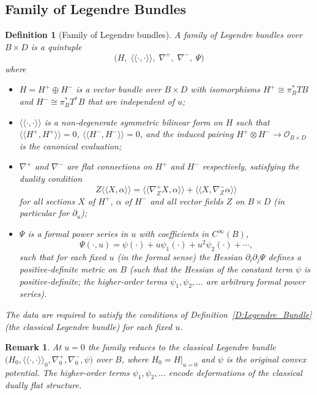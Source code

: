\documentclass[12pt]{amsart}
\newtheorem{dfn}{Definition}
\newtheorem{remark}{Remark}
\begin{document}
\subsection{Family of Legendre Bundles}\label{S:F-Legendrebundle}
\begin{dfn}[Family of Legendre bundles]\label{D:FLB}
A \emph{family of Legendre bundles} over $B\times D$ is a quintuple
\[
\bigl( H,\; \langle\!\langle\cdot,\cdot\rangle\!\rangle,\; \nabla^+,\; \nabla^-,\; \Psi \bigr)
\]
where
\begin{itemize}
\item $H = H^+ \oplus H^-$ is a vector bundle over $B\times D$ with isomorphisms 
  $H^+ \cong \pi_B^*TB$ and $H^- \cong \pi_B^*T^*B$ that are independent of $u$;
\item $\langle\!\langle\cdot,\cdot\rangle\!\rangle$ is a non‑degenerate symmetric bilinear form on $H$ such that 
  $\langle\!\langle H^+,H^+\rangle\!\rangle = 0$, $\langle\!\langle H^-,H^-\rangle\!\rangle = 0$,
  and the induced pairing $H^+\otimes H^-\to \mathcal{O}_{B\times D}$ is the canonical evaluation;
\item $\nabla^+$ and $\nabla^-$ are flat connections on $H^+$ and $H^-$ respectively, 
  satisfying the duality condition
  \[
  Z\langle\!\langle X,\alpha\rangle\!\rangle = \langle\!\langle \nabla^+_Z X,\alpha\rangle\!\rangle + \langle\!\langle X,\nabla^-_Z\alpha\rangle\!\rangle
  \]
  for all sections $X$ of $H^+$, $\alpha$ of $H^-$ and all vector fields $Z$ on $B\times D$ (in particular for $\partial_u$);
\item $\Psi$ is a formal power series in $u$ with coefficients in $C^\infty(B)$,
  \[
  \Psi(\cdot,u) = \psi(\cdot) + u\psi_1(\cdot) + u^2\psi_2(\cdot) + \cdots,
  \]
  such that for each fixed $u$ (in the formal sense) the Hessian $\partial_i\partial_j\Psi$ defines a positive‑definite metric on $B$ (such that the Hessian of the constant term $\psi$ is positive‑definite; the higher‑order terms $\psi_1,\psi_2,\dots$ are arbitrary formal power series).
\end{itemize}
The data are required to satisfy the conditions of Definition~\ref{D:Legendre_Bundle} (the classical Legendre bundle) for each fixed $u$.
\end{dfn}


\begin{remark}

At $u=0$ the family reduces to the classical Legendre bundle $\bigl( H_0,\langle\!\langle\cdot,\cdot\rangle\!\rangle_0,\nabla^+_0,\nabla^-_0,\psi \bigr)$ over $B$, where $H_0 = H|_{u=0}$ and $\psi$ is the original convex potential. The higher‑order terms $\psi_1,\psi_2,\dots$ encode deformations of the classical dually flat structure.
\end{remark}
\end{document}
